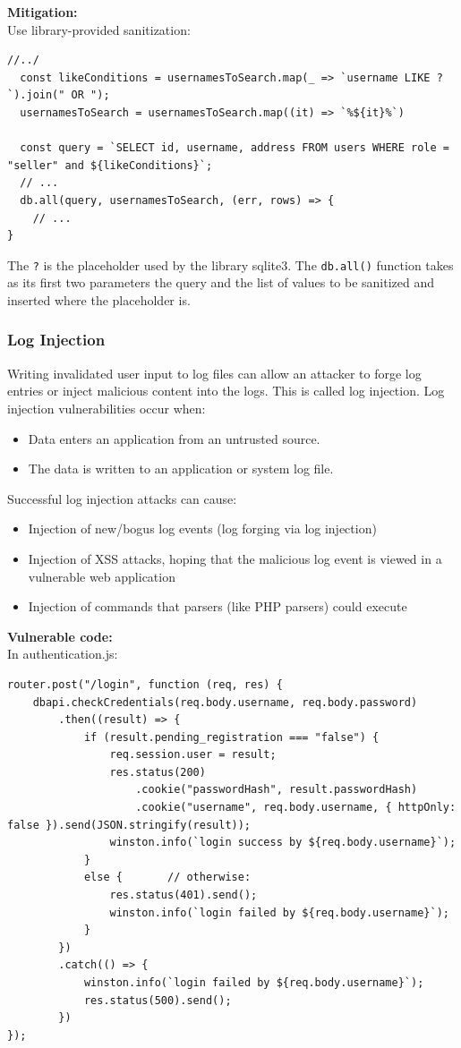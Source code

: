\documentclass[]{article}
\begin{document}
\textbf{Mitigation:} \\ Use library-provided sanitization:
\begin{lstlisting}
//../
  const likeConditions = usernamesToSearch.map(_ => `username LIKE ?`).join(" OR ");
  usernamesToSearch = usernamesToSearch.map((it) => `%${it}%`)

  const query = `SELECT id, username, address FROM users WHERE role = "seller" and ${likeConditions}`;
  // ...
  db.all(query, usernamesToSearch, (err, rows) => {
	// ...
}
\end{lstlisting}
The \texttt{?} is the placeholder used by the library sqlite3. The \texttt{db.all()} function takes as its first two parameters the query and the list of values to be sanitized and inserted where the placeholder is.

\subsubsection{Log Injection}
Writing invalidated user input to log files can allow an attacker to forge log entries or inject malicious content into the logs. This is called log injection. Log injection vulnerabilities occur when:
\begin{itemize}
    \item Data enters an application from an untrusted source.
    \item The data is written to an application or system log file.
\end{itemize}
Successful log injection attacks can cause:
\begin{itemize}
    \item Injection of new/bogus log events (log forging via log injection)
    \item Injection of XSS attacks, hoping that the malicious log event is viewed in a vulnerable web application
    \item Injection of commands that parsers (like PHP parsers) could execute
\end{itemize}
\textbf{Vulnerable code:} \\
In authentication.js:
\begin{lstlisting}
router.post("/login", function (req, res) {
    dbapi.checkCredentials(req.body.username, req.body.password)
        .then((result) => {
            if (result.pending_registration === "false") {
                req.session.user = result;                                                                  
                res.status(200)
                    .cookie("passwordHash", result.passwordHash)
                    .cookie("username", req.body.username, { httpOnly: false }).send(JSON.stringify(result));
                winston.info(`login success by ${req.body.username}`);
            }
            else {       // otherwise:
                res.status(401).send();
                winston.info(`login failed by ${req.body.username}`);
            }
        })
        .catch(() => {
            winston.info(`login failed by ${req.body.username}`);
            res.status(500).send();
        })
});
\end{lstlisting}
\end{document}
